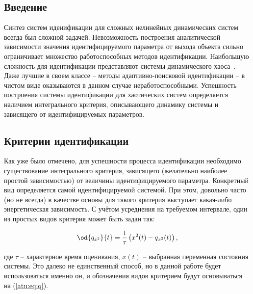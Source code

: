 \documentclass[a4paper,paratype,12pt,fouriernc]{cmonogra}
\title{\bookname}
\author{Коллективный автор}
\begin{document}
\tableofcontents



\subsection*{Введение}

Синтез систем иденификации для сложных нелинейных динамических систем
всегда был сложной задачей. Невозможность построения
аналитической зависимости значения идентифицируемого параметра
от выхода объекта сильно ограничивает множество работоспособных
методов идентификации. Наибольшую сложность для идентификации
представляют системы динамического хаоса~\cite{moon_chaotic_vibr,anisch_nonlin_eff,sprott_212}.
Даже лучшие в своем классе -- методы адаптивно-поисковой идентификации -- %
в чистом виде оказываются в данном случае неработоспособными.
Успешность построения системы идентификации для хаотических
систем определяется наличием интегрального критерия,
описывающего динамику системы и зависящего от идентифицируемых параметров.


\subsection*{Критерии идентификации}

Как уже было отмечено, для успешности процесса идентификации необходимо
существование интегрального критерия, зависящего (желательно наиболее простой зависимостью)
от величины идентифицируемого параметра. Конкретный вид определяется самой идентифицируемой
системой. При этом, довольно часто (но не всегда) в качестве основы для такого критерия выступает
какая-либо энергетическая зависимость. С учётом усреднения на требуемом интервале,
один из простых видов критерия может быть задан так:

\begin{equation}
\od{q_{x^2}}{t}
=
\frac{1}{\tau} \left( x^2(t) - q_{x^2}(t) \right)
,
\label{atu:eq:q}
\end{equation}

\noindent
где $\tau$ -- характерное время оценивания, $x(t)$ -- выбранная переменная состояния системы.
Это далеко не единственный способ, но в данной работе будет использоваться именно он,
и обозначения видов критерием будут основываться на (\ref{atu:eq:q}).
\end{document}
